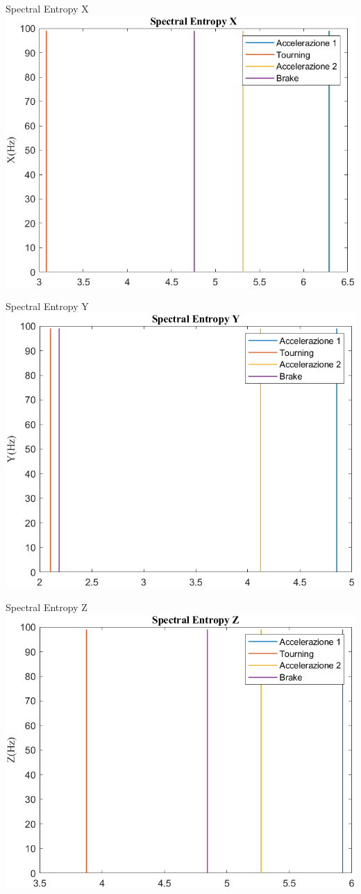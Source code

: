\documentclass[beamer]{standalone}
\begin{document}
	\begin{frame}{{Spectral Entropy X}}
		\centering\includegraphics[height=.8\textheight]{figure/Mag/Trasformata/Spectral EntropyX}
	\end{frame}
	
	\begin{frame}{{Spectral Entropy Y}}
		\centering\includegraphics[height=.8\textheight]{figure/Mag/Trasformata/Spectral EntropyY}
	\end{frame}
	
	\begin{frame}{{Spectral Entropy Z}}
		\centering\includegraphics[height=.8\textheight]{figure/Mag/Trasformata/Spectral EntropyZ}
	\end{frame}
	
\end{document}
